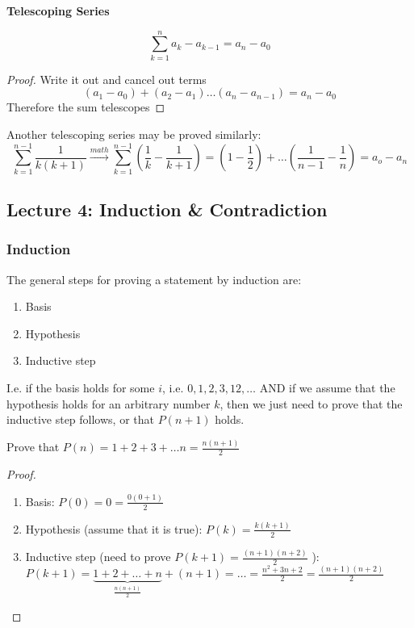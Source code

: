 \documentclass[../notes.tex]{subfiles}
\begin{document}
\textbf{Telescoping Series} 

\begin{equation}
	\sum_{k=1}^{n} a_k - a_{k-1} = a_n - a_0
\end{equation}

\begin{proof}
	Write it out and cancel out terms
	\begin{equation}
		(a_1 - a_0) + (a_2 - a_1) \ldots (a_n - a_{n-1}) = a_n - a_0
	\end{equation}
	Therefore the sum telescopes
\end{proof}


Another telescoping series may be proved similarly:
\begin{equation}
	\sum^{n-1}_{k=1} \frac{1}{k(k+1)} \xrightarrow{math} \sum^{n-1}_{k=1} (\frac{1}{k} - \frac{1}{k+1}) 
	= 
	(1- \frac{1}{2}) + \ldots (\frac{1}{n-1} - \frac{1}{n}) = a_o - a_n
\end{equation}


\subsection{Lecture 4: Induction \& Contradiction}


\subsubsection{Induction}

The general steps for proving a statement by induction are:
\begin{enumerate}
	\item Basis
	\item Hypothesis
	\item Inductive step
\end{enumerate}

I.e. if the basis holds for some $ i $, i.e. $ 0, 1, 2, 3, 12, \ldots$ AND if we assume that the hypothesis holds for an arbitrary number $ k $, then we just need to prove that the inductive step follows, or that $ P(n+1) $ holds.

\begin{example}
	Prove that $ P(n) = 1+2+3+\ldots n = \frac{n(n+1)}{2} $ 
	\begin{proof}
		
	

	\begin{enumerate}
		\item Basis: $ P(0) = 0 = \frac{0(0+1)}{2} $
		\item Hypothesis (assume that it is true): $ P(k) = \frac{k(k+1)}{2} $
	\item Inductive step (need to prove $ P(k+1) = \frac{(n+1)(n+2)}{2} $ ): $ P(k+1) = \underbrace{1+2+\ldots+n}_{\frac{n(n+1)}{2}} + (n+1) = \ldots = \frac{n^2 + 3n + 2}{2} = \frac{(n+1)(n+2)}{2} $
	\end{enumerate}

	\end{proof}
	
\end{example}
\end{document}
